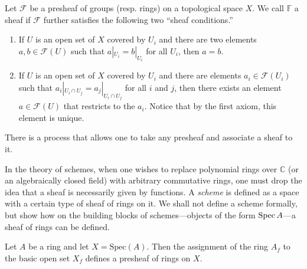 \begin{definition} Let $\mathcal{F}$ be a presheaf of groups
(resp. rings) on a topological space $X$. We call $\mathbb{F}$ a
sheaf if $\mathcal{F}$ further satisfies the following two
``sheaf conditions.''\begin{enumerate}
\item{If $U$ is an open set of $X$ covered by $U_i$ and there
are two elements $a,b\in \mathcal{F}(U)$ such that
$a|_{U_i}=b|_{U_i}$ for all $U_i$, then $a=b$.}
\item{If $U$ is an open set of $X$ covered by $U_i$ and there
are elements $a_i\in \mathcal{F}(U_i)$ such that $a_i|_{U_i\cap
U_j} = a_j|_{U_i\cap U_j}$ for all $i$ and $j$, then there
exists an element $a\in\mathcal{F}(U)$ that restricts to the
$a_i$. Notice that by the first axiom, this element is unique.}
\end{enumerate}
\end{definition}

There is a process that allows one to take any presheaf and
associate a sheaf to it.

In the theory of schemes, when one wishes to replace polynomial
rings over
$\mathbb{C}$ (or an algebraically closed field) with arbitrary
commutative
rings, one must drop the idea that a sheaf is necessarily given
by functions.
A \emph{scheme} is defined as a space with a certain type of
sheaf of rings on
it. We shall not define a scheme formally, but show how on the
building blocks
of schemes---objects of the form $\operatorname{Spec} A$---a sheaf of rings
can be defined.

\begin{proposition}
Let $ A$ be a ring and let $ X = \mathrm{Spec}(A)$. Then the
assignment of the ring $A_f$ to the basic open set $X_f$ defines
a presheaf of rings on $X$.
\end{proposition}

